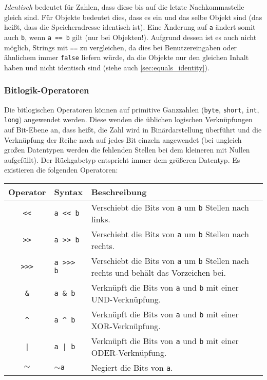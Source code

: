 		\textit{Identisch} bedeutet für Zahlen, dass diese bis auf die letzte Nachkommastelle gleich sind. Für Objekte bedeutet dies, dass es ein und das selbe Objekt sind (das heißt, dass die Speicheradresse identisch ist). Eine Änderung auf \texttt{a} ändert somit auch \texttt{b}, wenn \texttt{a == b} gilt (nur bei Objekten!). Aufgrund dessen ist es auch nicht möglich, Strings mit \texttt{==} zu vergleichen, da dies bei Benutzereingaben oder ähnlichem immer \lstinline|false| liefern würde, da die Objekte nur den gleichen Inhalt haben und nicht identisch sind (siehe auch \ref{sec:equals_identity}).
	
	\subsubsection{Bitlogik-Operatoren}
		Die bitlogischen Operatoren können auf primitive Ganzzahlen (\lstinline|byte|, \lstinline|short|, \lstinline|int|, \lstinline|long|) angewendet werden. Diese wenden die üblichen logischen Verknüpfungen auf Bit-Ebene an, dass heißt, die Zahl wird in Binärdarstellung überführt und die Verknüpfung der Reihe nach auf jedes Bit einzeln angewendet (bei ungleich großen Datentypen werden die fehlenden Stellen bei dem kleineren mit Nullen aufgefüllt). Der Rückgabetyp entspricht immer dem größeren Datentyp. Es existieren die folgenden Operatoren:
		\begin{table}[H]
			\centering
			\begin{tabular}{c | l | l}
				\textbf{Operator} & \textbf{Syntax}      & \textbf{Beschreibung}                                                                               \\ \hline
				  \texttt{<{}<}   & \texttt{a <{}< b}    & Verschiebt die Bits von \texttt{a} um \texttt{b} Stellen nach links.                                \\
				  \texttt{>{}>}   & \texttt{a >{}> b}    & Verschiebt die Bits von \texttt{a} um \texttt{b} Stellen nach rechts.                               \\
				\texttt{>{}>{}>}  & \texttt{a >{}>{}> b} & Verschiebt die Bits von \texttt{a} um \texttt{b} Stellen nach rechts und behält das Vorzeichen bei. \\
				   \texttt{\&}    & \texttt{a \& b}      & Verknüpft die Bits von \texttt{a} und \texttt{b} mit einer UND-Verknüpfung.                         \\
				   \texttt{\^}    & \texttt{a \^{} b}    & Verknüpft die Bits von \texttt{a} und \texttt{b} mit einer XOR-Verknüpfung.                         \\
				   \texttt{|}     & \texttt{a | b}       & Verknüpft die Bits von \texttt{a} und \texttt{b} mit einer ODER-Verknüpfung.                        \\
				\texttt{\(\sim\)} & \texttt{\(\sim\)a}   & Negiert die Bits von \texttt{a}.
			\end{tabular}
		\end{table}
	
